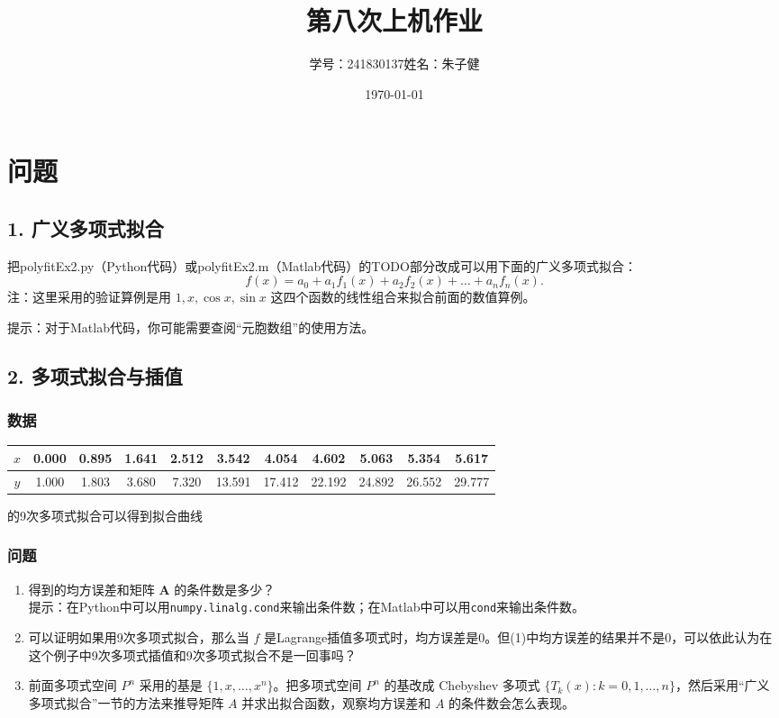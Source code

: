 \documentclass{article}
\title{第八次上机作业}
\author{学号：241830137\quad 姓名：朱子健}
\date{\today}
\begin{document}
\maketitle

\section{问题}
\subsection*{1. 广义多项式拟合}
把polyfitEx2.py（Python代码）或polyfitEx2.m（Matlab代码）的TODO部分改成可以用下面的广义多项式拟合：
\[
f(x) = a_0 + a_1f_1(x) + a_2f_2(x) + \dots + a_n f_n(x).
\]
注：这里采用的验证算例是用 \(1,x,\cos x,\sin x\) 这四个函数的线性组合来拟合前面的数值算例。

提示：对于Matlab代码，你可能需要查阅“元胞数组”的使用方法。

\subsection*{2. 多项式拟合与插值}
\subsubsection*{数据}
\begin{center}
\begin{tabular}{|c|c|c|c|c|c|c|c|c|c|c|}
\hline
$x$ & 0.000 & 0.895 & 1.641 & 2.512 & 3.542 & 4.054 & 4.602 & 5.063 & 5.354 & 5.617 \\
\hline
$y$ & 1.000 & 1.803 & 3.680 & 7.320 & 13.591 & 17.412 & 22.192 & 24.892 & 26.552 & 29.777 \\
\hline
\end{tabular}
\end{center}

的9次多项式拟合可以得到拟合曲线



\subsubsection*{问题}
\begin{enumerate}
    \item 得到的均方误差和矩阵 \(\mathbf{A}\) 的条件数是多少？\\
    提示：在Python中可以用\texttt{numpy.linalg.cond}来输出条件数；在Matlab中可以用\texttt{cond}来输出条件数。
    \item 可以证明如果用9次多项式拟合，那么当 \(f\) 是Lagrange插值多项式时，均方误差是0。但(1)中均方误差的结果并不是0，可以依此认为在这个例子中9次多项式插值和9次多项式拟合不是一回事吗？
    \item 前面多项式空间 \(P^n\) 采用的基是 \(\{1, x, \dots , x^n\}\)。把多项式空间 \(P^n\) 的基改成 Chebyshev 多项式 \(\{T_k(x): k = 0, 1, \dots , n\}\)，然后采用“广义多项式拟合”一节的方法来推导矩阵 \(A\) 并求出拟合函数，观察均方误差和 \(A\) 的条件数会怎么表现。
\end{enumerate}
\end{document}
